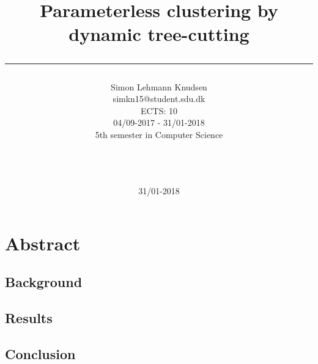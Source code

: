\documentclass[a4paper,10pt]{article}
\title{ Parameterless clustering by dynamic tree-cutting \rule{10cm}{0.5mm}}
\author{Simon Lehmann Knudsen \\
	simkn15@student.sdu.dk \\
	ECTS: 10 \\
	04/09-2017 - 31/01-2018 \\
	5th semester in Computer Science
\\\rule{5.5cm}{0.5mm}\\}
\date{31/01-2018}
\theoremstyle{plain}
\theoremstyle{definition}
\begin{document}
\maketitle

\newpage
\tableofcontents

\newpage
\section*{Abstract}

\subsection*{Background}

\subsection*{Results}

\subsection*{Conclusion}

\newpage
\end{document}
